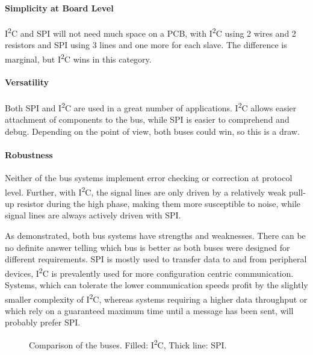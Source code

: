 \documentclass[journal]{IEEEtran}
\newcommand{\twi}{I\textsuperscript{2}C\xspace}
\begin{document}
\paragraph*{Simplicity at Board Level}
\twi and SPI will not need much space on a PCB, with \twi using 2 wires and 2 resistors and SPI using 3 lines and one more for each slave. The difference is marginal, but \twi wins in this category.

\paragraph*{Versatility}
Both SPI and \twi are used in a great number of applications. \twi allows easier attachment of components to the bus, while SPI is easier to comprehend and debug. Depending on the point of view, both buses could win, so this is a draw.

\paragraph*{Robustness}
Neither of the bus systems implement error checking or correction at protocol level. Further, with \twi, the signal lines are only driven by a relatively weak pull-up resistor during the high phase, making them more susceptible to noise, while signal lines are always actively driven with SPI.


As demonstrated, both bus systems have strengths and weaknesses. There can be no definite answer telling which bus is better as both buses were designed for different requirements. SPI is mostly used to transfer data to and from peripheral devices, \twi is prevalently used for more configuration centric communication. Systems, which can tolerate the lower communication speeds profit by the slightly smaller complexity of \twi, whereas systems requiring a higher data throughput or which rely on a guaranteed maximum time until a message has been sent, will probably prefer SPI.


\begin{figure}[!t]
	\centering
	\caption{Comparison of the buses. Filled: \twi, Thick line: SPI.}
	\label{i2c_spi_comparison_spider}
\end{figure}
\end{document}
